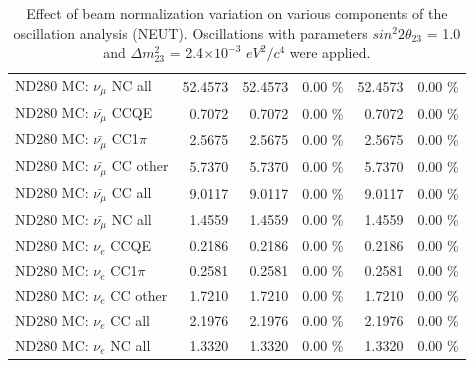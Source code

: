 \begin{table}
\begin{tabular}{| l | r | r  r | r  r |}
                                          ND280 MC: $\nu_{\mu}$ NC all &         52.4573 &         52.4573 &  0.00 \%  &         52.4573 &  0.00 \%  \\ 
                                      ND280 MC: $\bar{\nu_{\mu}}$ CCQE &          0.7072 &          0.7072 &  0.00 \%  &          0.7072 &  0.00 \%  \\ 
                                  ND280 MC: $\bar{\nu_{\mu}}$ CC1$\pi$ &          2.5675 &          2.5675 &  0.00 \%  &          2.5675 &  0.00 \%  \\ 
                                  ND280 MC: $\bar{\nu_{\mu}}$ CC other &          5.7370 &          5.7370 &  0.00 \%  &          5.7370 &  0.00 \%  \\ 
                                    ND280 MC: $\bar{\nu_{\mu}}$ CC all &          9.0117 &          9.0117 &  0.00 \%  &          9.0117 &  0.00 \%  \\ 
                                    ND280 MC: $\bar{\nu_{\mu}}$ NC all &          1.4559 &          1.4559 &  0.00 \%  &          1.4559 &  0.00 \%  \\ 
                                              ND280 MC: $\nu_{e}$ CCQE &          0.2186 &          0.2186 &  0.00 \%  &          0.2186 &  0.00 \%  \\ 
                                          ND280 MC: $\nu_{e}$ CC1$\pi$ &          0.2581 &          0.2581 &  0.00 \%  &          0.2581 &  0.00 \%  \\ 
                                          ND280 MC: $\nu_{e}$ CC other &          1.7210 &          1.7210 &  0.00 \%  &          1.7210 &  0.00 \%  \\ 
                                            ND280 MC: $\nu_{e}$ CC all &          2.1976 &          2.1976 &  0.00 \%  &          2.1976 &  0.00 \%  \\ 
                                            ND280 MC: $\nu_{e}$ NC all &          1.3320 &          1.3320 &  0.00 \%  &          1.3320 &  0.00 \%  \\ 
\hline
\end{tabular}
\caption{ 
  Effect of beam normalization variation
  on various components of the oscillation analysis (NEUT).
  Oscillations with parameters $sin^{2}2\theta_{23}$ = 1.0 and $\Delta m^{2}_{23}$ = 2.4$\times10^{-3}$ $eV^{2}/c^{4}$ were applied.  
}
\label{tab:neut_beam_norm}
\end{table}


%
%
%
%

